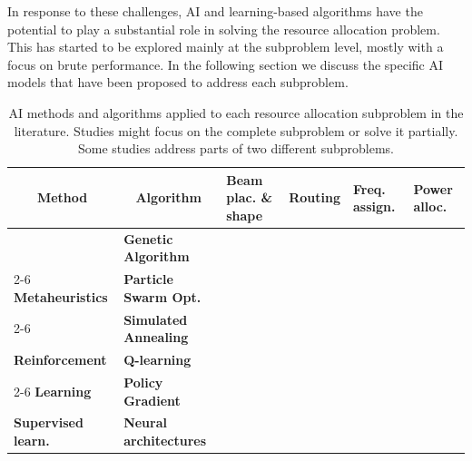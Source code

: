 \documentclass[letterpaper]{article} %
\begin{document}
In response to these challenges, AI and learning-based algorithms have the potential to play a substantial role in solving the resource allocation problem. This has started to be explored mainly at the subproblem level, mostly with a focus on brute performance. In the following section we discuss the specific AI models that have been proposed to address each subproblem.


\begin{table}
\begin{center}
\begin{tabular}{|l|l|m{3cm}|m{2cm}|m{2cm}|m{2cm}|}
\hline
\multicolumn{1}{|c|}{\textbf{Method}} & \multicolumn{1}{c|}{\textbf{Algorithm}} & \textbf{Beam plac. \& shape}  & \textbf{Routing}   & \textbf{Freq. assign.}   & \textbf{Power alloc.}   \\ \hline
  & \textbf{Genetic Algorithm}    & \citeyear{wangdynamic, Deng2018, He2017, Anzalchi2010, Angeletti2006} &  \citeyear{rao2011performance}  & \citeyear{He2017, tirmizi2015efficient, Angeletti2006, Paris2019} & \citeyear{Aravanis2015, Anzalchi2010, Paris2019} \\ \cline{2-6} 
\textbf{Metaheuristics}  & \textbf{Particle Swarm Opt.}   &   &     & \citeyear{pachler20b}  & \citeyear{Durand2017, pachler20b} \\ \cline{2-6} 
 & \textbf{Simulated Annealing} & \citeyear{Camino2014} &  & \citeyear{vidal2020joint, Cocco2018, Camino2014} & \citeyear{vidal2020joint, Cocco2018}   \\ \hline
\textbf{Reinforcement} & \textbf{Q-learning}  &  \citeyear{hu2020dynamic}  &  \citeyear{gong2020adaptive}  & \citeyear{liao2020distributed, zheng2020leo, Ferreira2018, Hu2018ASystems}   & \citeyear{zhang2020online, liao2020distributed, Ferreira2018}  \\ \cline{2-6} 
\textbf{Learning}   & \textbf{Policy Gradient}  &   &    &    & \citeyear{Luis2019, Luis2020} \\ \hline
\textbf{Supervised learn.}  & \textbf{Neural architectures}  &  &  & \citeyear{Funabiki1997, Salcedo-Sanz2005}  & \\ \hline
\end{tabular}
\end{center}
\caption{AI methods and algorithms applied to each resource allocation subproblem in the literature. Studies might focus on the complete subproblem or solve it partially. Some studies address parts of two different subproblems.}
\label{tab:literature}
\end{table}
\end{document}
